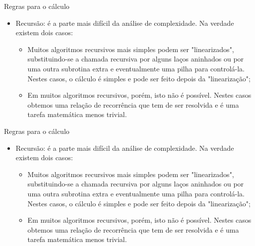 \documentclass[12pt,table,xcolor={dvipsnames}]{beamer}
\begin{document}
\begin{frame}[fragile]{Regras para o cálculo}
\begin{itemize}
\item Recursão: é a parte mais difícil da análise de complexidade. Na verdade existem dois casos:
\begin{itemize}
\item Muitos algoritmos recursivos mais simples podem ser "linearizados", substituindo-se a chamada recursiva por alguns laços aninhados ou por uma outra subrotina extra e eventualmente uma pilha para controlá-la. Nestes casos, o cálculo é simples e pode ser feito depois da "linearização";
\item Em muitos algoritmos recursivos, porém, isto não é possível. Nestes casos obtemos uma relação de recorrência que tem de ser resolvida e é uma tarefa matemática menos trivial.
\end{itemize}
\end{itemize}
\end{frame}

\begin{frame}[fragile]{Regras para o cálculo}
\begin{itemize}
\item Recursão: é a parte mais difícil da análise de complexidade. Na verdade existem dois casos:
\begin{itemize}
\item Muitos algoritmos recursivos mais simples podem ser "linearizados", substituindo-se a chamada recursiva por alguns laços aninhados ou por uma outra subrotina extra e eventualmente uma pilha para controlá-la. Nestes casos, o cálculo é simples e pode ser feito depois da "linearização";
\item Em muitos algoritmos recursivos, porém, isto não é possível. Nestes casos obtemos uma relação de recorrência que tem de ser resolvida e é uma tarefa matemática menos trivial.
\end{itemize}
\end{itemize}
\end{frame}
\end{document}
